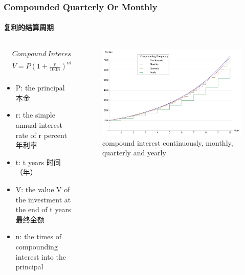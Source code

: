 \documentclass[
	11pt, %
]{beamer}
\begin{document}
\begin{frame}
	\frametitle{Compounded Quarterly Or Monthly}
	\framesubtitle{复利的结算周期}

	\begin{columns}[t] 
		\begin{column}{0.5\textwidth} %
			\begin{equation*}
			  \begin{aligned}
			  	&Compound\ Interest:\\ 	&V =P(1 + \frac{r}{100n})^{nt}\\
			  \end{aligned}
			\end{equation*}
			\begin{itemize}
				\item P: the principal 本金 
			  \item		r:  the simple annual interest rate of r  percent  年利率
			  \item		t:  t years  时间（年）
			  \item		V:  the value V of the investment at the end of t years  最终金额
			  \item n: the times of compounding interest into the principal
			\end{itemize}
		\end{column}

		\begin{column}{0.5\textwidth} %
			\begin{figure}
				\includegraphics[width=\linewidth]{Compound_Interest_with_Varying_Frequencies.svg.png}
				\caption{compound interest continuously, monthly, quarterly and yearly}
			\end{figure}
    \end{column}
	\end{columns}
\end{frame}
\end{document}
